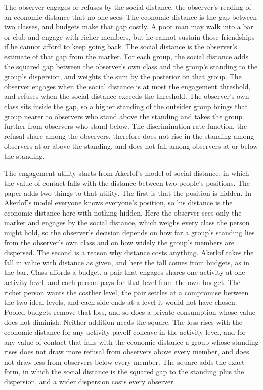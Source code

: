 The observer engages or refuses by the social distance, the observer's
reading of an economic distance that no one sees. The economic distance is
the gap between two classes, and budgets make that gap costly. A poor man
may walk into a bar or club and engage with richer members, but he cannot
sustain those friendships if he cannot afford to keep going back. The
social distance is the observer's estimate of that gap from the marker. For
each group, the social distance adds the squared gap between the observer's
own class and the group's standing to the group's dispersion, and weights
the sum by the posterior on that group. The observer engages when the
social distance is at most the engagement threshold, and refuses when the
social distance exceeds the threshold. The observer's own class sits
inside the gap, so a higher standing of the outsider group brings that
group nearer to observers who stand above the standing and takes the group
further from observers who stand below. The discrimination-rate function,
the refusal share among the observers, therefore does not rise in the
standing among observers at or above the standing, and does not fall among
observers at or below the standing.

The engagement utility starts from Akerlof's model of social distance, in
which the value of contact falls with the distance between two people's
positions. The paper adds two things to that utility. The first is that the
position is hidden. In Akerlof's model everyone knows everyone's position,
so his distance is the economic distance here with nothing hidden. Here the
observer sees only the marker and engages by the social distance, which
weighs every class the person might hold, so the observer's decision
depends on how far a group's standing lies from the observer's own class
and on how widely the group's members are dispersed. The second is a reason
why distance costs anything. Akerlof takes the fall in value with distance
as given, and here the fall comes from budgets, as in the bar. Class
affords a budget, a pair that engages shares one activity at one activity
level, and each person pays for that level from the own budget. The richer
person wants the costlier level, the pair settles at a compromise between
the two ideal levels, and each side ends at a level it would not have
chosen. Pooled budgets remove that loss, and so does a private consumption
whose value does not diminish. Neither addition needs the square. The loss
rises with the economic distance for any activity payoff concave in the
activity level, and for any value of contact that falls with the economic
distance a group whose standing rises does not draw more refusal from
observers above every member, and does not draw less from observers below
every member. The square adds the exact form, in which the social distance
is the squared gap to the standing plus the dispersion, and a wider
dispersion costs every observer.

